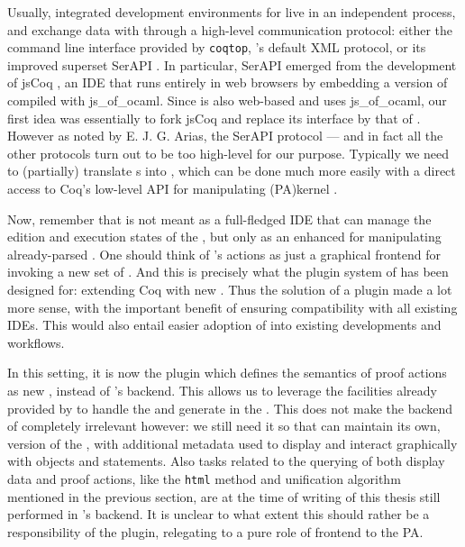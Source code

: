 Usually, integrated development environments for  live in an independent
process, and exchange data with  through a high-level communication protocol:
either the command line interface provided by \texttt{coqtop}, 's default XML
protocol, or its improved superset SerAPI .
In particular, SerAPI emerged from the development of jsCoq
, an IDE that runs entirely in web browsers by
embedding a version of  compiled with js\_of\_ocaml. Since  is also
web-based and uses js\_of\_ocaml, our first idea was essentially to fork jsCoq
and replace its interface by that of . However as noted by E. J. G. Arias,
the SerAPI protocol --- and in fact all the other protocols turn out to be too
high-level for our purpose. Typically we need to (partially) translate  s
into  , which can be done much more easily with a direct access to
Coq's low-level API for manipulating \kl(PA){kernel} .

Now, remember that  is not meant as a full-fledged IDE that can manage the
edition and execution states of the , but only as an enhanced  for manipulating already-parsed . One should think of 's actions
as just a graphical frontend for invoking a new set of . And this is
precisely what the plugin system of  has been designed for: extending Coq
with new . Thus the solution of a  plugin made a lot more sense, with
the important benefit of ensuring compatibility with all existing IDEs. This
would also entail easier adoption of  into existing  developments and
workflows.

In this setting, it is now the  plugin which defines the semantics of proof
actions as new , instead of 's backend. This allows us to leverage
the facilities already provided by  to handle the  and generate
 in the . This does not
make the backend of  completely irrelevant however: we still need it so
that  can maintain its own,  version of the ,
with additional metadata used to display and interact graphically with objects
and statements. Also tasks related to the querying of both display data and
proof actions, like the \texttt{html} method and unification algorithm mentioned
in the previous section, are at the time of writing of this thesis still
performed in 's backend. It is unclear to what extent this should rather
be a responsibility of the  plugin, relegating  to a pure role of
frontend to the PA.

